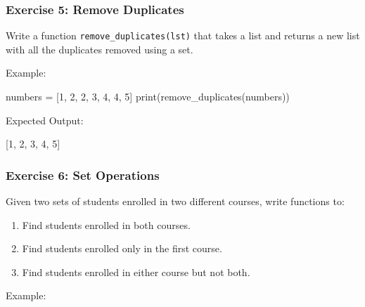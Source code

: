 \documentclass[
  letterpaper,
  DIV=11,
  numbers=noendperiod]{scrreprt}
\newenvironment{Shaded}{\begin{snugshade}}{\end{snugshade}}
\newcommand{\BuiltInTok}[1]{\textcolor[rgb]{0.00,0.23,0.31}{#1}}
\newcommand{\DecValTok}[1]{\textcolor[rgb]{0.68,0.00,0.00}{#1}}
\newcommand{\NormalTok}[1]{\textcolor[rgb]{0.00,0.23,0.31}{#1}}
\newcommand{\OperatorTok}[1]{\textcolor[rgb]{0.37,0.37,0.37}{#1}}
\providecommand{\tightlist}{%
  \setlength{\itemsep}{0pt}\setlength{\parskip}{0pt}}\usepackage{longtable,booktabs,array}
\begin{document}
\hypertarget{exercise-5-remove-duplicates}{%
\subsubsection{Exercise 5: Remove
Duplicates}\label{exercise-5-remove-duplicates}}

Write a function \texttt{remove\_duplicates(lst)} that takes a list and
returns a new list with all the duplicates removed using a set.

Example:

\begin{Shaded}
\begin{Highlighting}[]
\NormalTok{numbers }\OperatorTok{=}\NormalTok{ [}\DecValTok{1}\NormalTok{, }\DecValTok{2}\NormalTok{, }\DecValTok{2}\NormalTok{, }\DecValTok{3}\NormalTok{, }\DecValTok{4}\NormalTok{, }\DecValTok{4}\NormalTok{, }\DecValTok{5}\NormalTok{]}
\BuiltInTok{print}\NormalTok{(remove\_duplicates(numbers))}
\end{Highlighting}
\end{Shaded}

Expected Output:

\begin{Shaded}
\begin{Highlighting}[]
\NormalTok{[}\DecValTok{1}\NormalTok{, }\DecValTok{2}\NormalTok{, }\DecValTok{3}\NormalTok{, }\DecValTok{4}\NormalTok{, }\DecValTok{5}\NormalTok{]}
\end{Highlighting}
\end{Shaded}

\hypertarget{exercise-6-set-operations}{%
\subsubsection{Exercise 6: Set
Operations}\label{exercise-6-set-operations}}

Given two sets of students enrolled in two different courses, write
functions to:

\begin{enumerate}
\def\labelenumi{\arabic{enumi}.}
\tightlist
\item
  Find students enrolled in both courses.
\item
  Find students enrolled only in the first course.
\item
  Find students enrolled in either course but not both.
\end{enumerate}

Example:
\end{document}
